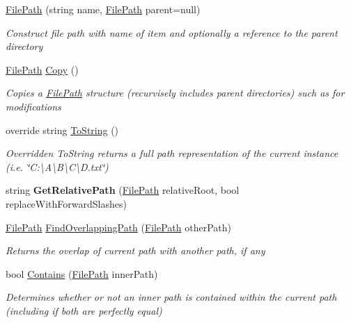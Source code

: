 \begin{DoxyCompactItemize}
\item 
\hyperlink{class_cloud_api_public_1_1_model_1_1_file_path_a808fa118b10dc8ff0bedac77d5114353}{File\-Path} (string name, \hyperlink{class_cloud_api_public_1_1_model_1_1_file_path}{File\-Path} parent=null)
\begin{DoxyCompactList}\small\item\em Construct file path with name of item and optionally a reference to the parent directory \end{DoxyCompactList}\item 
\hyperlink{class_cloud_api_public_1_1_model_1_1_file_path}{File\-Path} \hyperlink{class_cloud_api_public_1_1_model_1_1_file_path_af5779a5ded786612570db88f1fed976d}{Copy} ()
\begin{DoxyCompactList}\small\item\em Copies a \hyperlink{class_cloud_api_public_1_1_model_1_1_file_path}{File\-Path} structure (recurvisely includes parent directories) such as for modifications \end{DoxyCompactList}\item 
override string \hyperlink{class_cloud_api_public_1_1_model_1_1_file_path_a806dd9bf2dad9a537a87330001ba0752}{To\-String} ()
\begin{DoxyCompactList}\small\item\em Overridden To\-String returns a full path representation of the current instance (i.\-e. \char`\"{}\-C\-:\textbackslash{}\-A\textbackslash{}\-B\textbackslash{}\-C\textbackslash{}\-D.\-txt\char`\"{}) \end{DoxyCompactList}\item 
\hypertarget{class_cloud_api_public_1_1_model_1_1_file_path_a695712bfd6b6293199e04085b04e2f50}{string {\bfseries Get\-Relative\-Path} (\hyperlink{class_cloud_api_public_1_1_model_1_1_file_path}{File\-Path} relative\-Root, bool replace\-With\-Forward\-Slashes)}\label{class_cloud_api_public_1_1_model_1_1_file_path_a695712bfd6b6293199e04085b04e2f50}

\item 
\hyperlink{class_cloud_api_public_1_1_model_1_1_file_path}{File\-Path} \hyperlink{class_cloud_api_public_1_1_model_1_1_file_path_aa9f2baee747ea9b26c875e9f572c7519}{Find\-Overlapping\-Path} (\hyperlink{class_cloud_api_public_1_1_model_1_1_file_path}{File\-Path} other\-Path)
\begin{DoxyCompactList}\small\item\em Returns the overlap of current path with another path, if any \end{DoxyCompactList}\item 
bool \hyperlink{class_cloud_api_public_1_1_model_1_1_file_path_af19b6d43f8a02c8ea4b28e8a1fbd89b2}{Contains} (\hyperlink{class_cloud_api_public_1_1_model_1_1_file_path}{File\-Path} inner\-Path)
\begin{DoxyCompactList}\small\item\em Determines whether or not an inner path is contained within the current path (including if both are perfectly equal) \end{DoxyCompactList}\end{DoxyCompactItemize}
